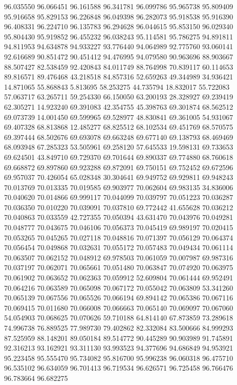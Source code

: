 96.035550
96.066451
96.161588
96.341781
96.099786
95.965738
95.809409
95.916658
95.829153
96.226848
96.049398
96.282073
95.918538
95.916390
96.408331
96.224710
96.135783
96.294628
96.044615
95.853150
96.029340
95.804430
95.919852
96.455232
96.038243
95.114581
95.786275
94.891811
94.811953
94.634878
94.933227
93.776440
94.064989
92.775760
93.060141
92.616689
90.851472
90.451412
94.476995
94.079580
90.963696
88.903667
88.507427
82.538459
92.420843
84.011749
88.764998
70.839117
60.114653
89.816571
89.476468
43.218518
84.857316
52.659263
49.344989
34.936421
14.871065
55.868843
5.813695
58.253275
44.735794
18.832017
55.722083
57.063717
63.265711
59.254330
66.150050
63.200193
28.328927
69.239419
62.305271
14.923240
69.391083
42.354755
45.398763
69.301874
68.562512
69.073739
14.001450
69.599965
69.528977
48.830841
69.361005
54.931067
69.407328
68.813868
12.485277
68.825512
68.102534
69.451769
68.570575
69.397444
68.502676
69.693078
69.663248
69.677140
69.138793
68.469469
68.093948
67.285323
53.505961
69.258120
57.645533
19.598131
69.733653
69.624501
43.849710
69.729370
69.701644
69.890337
69.774880
68.760618
69.668872
69.897860
69.923288
69.872091
69.750151
69.752452
69.672596
69.957037
70.426054
65.028348
30.304641
69.949752
69.929811
69.948243
70.013769
70.013335
70.019585
69.903977
70.062604
69.983135
34.836006
70.040620
70.014866
69.999117
70.044099
70.039797
70.051223
70.036287
70.036350
70.010220
70.039091
70.037810
69.772442
41.655628
70.036212
70.040863
70.033559
42.727355
70.050394
43.631470
70.043976
70.049281
70.048777
70.043675
70.046106
70.056373
70.045419
69.989197
70.020415
70.053265
70.045265
70.027118
70.048816
70.071397
70.056129
70.064374
70.056454
70.049868
70.032631
70.055172
70.057483
70.049434
70.061114
70.063507
70.062152
70.048912
69.978503
70.061059
70.007987
69.987316
70.037197
70.062071
70.065661
70.051480
70.063847
70.074920
70.063975
70.061902
70.063652
70.062363
70.059912
52.609804
70.061444
69.952491
70.064216
70.063589
70.065098
70.067172
70.055042
70.063809
53.341260
70.065139
70.067556
70.065526
70.066194
69.894142
70.065386
70.067116
70.069415
70.011680
70.066008
70.066663
70.065140
70.069097
70.067060
54.054903
70.068625
70.070626
59.710188
64.814140
67.873859
73.289618
74.996738
76.889525
77.989730
79.402862
82.332084
83.500666
84.999293
87.525959
88.148201
89.050184
89.514772
90.445289
90.903989
91.745891
92.316213
93.162921
93.311130
93.993523
94.377696
94.686849
94.953921
95.223458
95.555470
95.734082
95.816700
95.996238
96.060318
96.475710
96.535102
96.634059
96.701413
96.719534
96.626571
96.725458
96.766476
96.783664
96.682275
